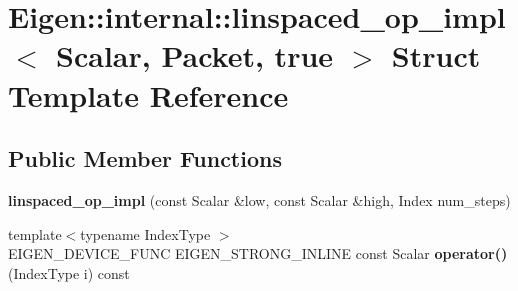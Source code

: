 \hypertarget{struct_eigen_1_1internal_1_1linspaced__op__impl_3_01_scalar_00_01_packet_00_01true_01_4}{}\section{Eigen\+::internal\+::linspaced\+\_\+op\+\_\+impl$<$ Scalar, Packet, true $>$ Struct Template Reference}
\label{struct_eigen_1_1internal_1_1linspaced__op__impl_3_01_scalar_00_01_packet_00_01true_01_4}
\subsection*{Public Member Functions}
\begin{DoxyCompactItemize}
\item 
\mbox{\label{struct_eigen_1_1internal_1_1linspaced__op__impl_3_01_scalar_00_01_packet_00_01true_01_4_af106870466a5d172c2fc61eb93228e88}} 
{\bfseries linspaced\+\_\+op\+\_\+impl} (const Scalar \&low, const Scalar \&high, Index num\+\_\+steps)
\item 
\mbox{\label{struct_eigen_1_1internal_1_1linspaced__op__impl_3_01_scalar_00_01_packet_00_01true_01_4_a590af4b00bfd20454a29b7d276724329}} 
{\footnotesize template$<$typename Index\+Type $>$ }\\E\+I\+G\+E\+N\+\_\+\+D\+E\+V\+I\+C\+E\+\_\+\+F\+U\+NC E\+I\+G\+E\+N\+\_\+\+S\+T\+R\+O\+N\+G\+\_\+\+I\+N\+L\+I\+NE const Scalar {\bfseries operator()} (Index\+Type i) const
\end{DoxyCompactItemize}
